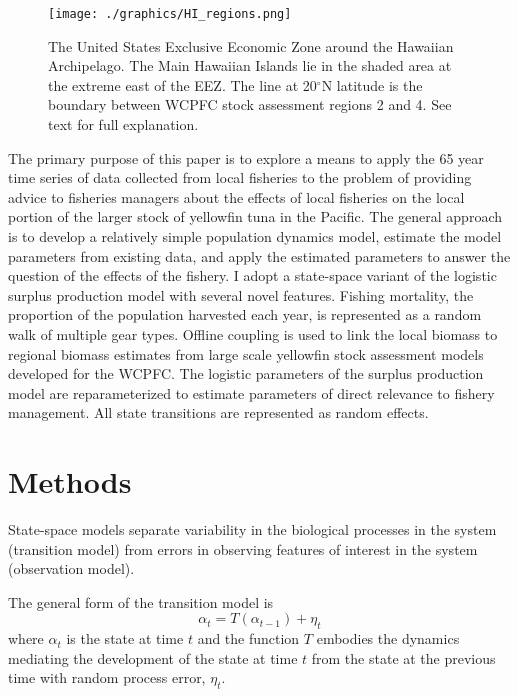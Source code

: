\documentclass[12pt,letterpaper]{article}
\renewcommand\deg[1]{$^\circ$#1}
\begin{document}
\begin{figure}
\begin{center}
\texttt{[image: ./graphics/HI\_regions.png]}
\caption{\label{fig:mhimap}
The United States Exclusive Economic Zone around the Hawaiian
Archipelago. The Main Hawaiian Islands lie in the shaded area at the
extreme east of the EEZ. The line at 20\deg{N} latitude is the
boundary between WCPFC stock assessment regions 2 and 4. See text for
full explanation.
}
\end{center}
\end{figure}

The primary purpose of this paper is to explore a means to apply the 65
year time series of
data collected from local fisheries to the problem of
providing advice to fisheries
managers about the effects of local fisheries on the local portion of
the larger stock of yellowfin tuna in the Pacific.
The general approach is to develop a relatively simple population
dynamics model, estimate the model parameters from existing
data, and apply the estimated parameters to answer the question of the
effects of the fishery.
I adopt a state-space variant of
the logistic surplus production model with several novel features.
Fishing mortality, the proportion of the population harvested each
year, is represented as a random walk of multiple gear types.
Offline coupling is used to link the local biomass to regional
biomass estimates from large scale yellowfin stock assessment models
developed for the WCPFC.
The logistic parameters of the surplus production model are
reparameterized to estimate parameters of direct relevance to fishery
management. All state transitions are represented as random effects.

\section*{Methods}
\label{sec:models}
State-space models separate variability in the biological
processes in the system (transition model)
from errors in observing features of interest
in the system (observation model).

The general form of the transition model is
\begin{equation}
\alpha_t=T(\alpha_{t-1}) + \eta_t
\end{equation}
where $\alpha_t$ is the state at time $t$ and 
the function $T$ embodies the dynamics mediating the
development of the state at time $t$ from the state at the previous
time with random process error, $\eta_t$.
\end{document}
